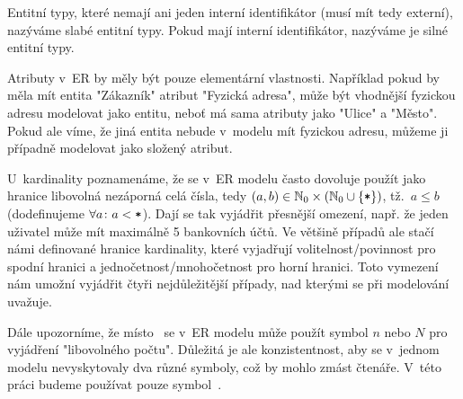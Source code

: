 Entitní typy, které nemají ani jeden interní identifikátor (musí mít tedy externí), nazýváme slabé entitní typy.
Pokud mají interní identifikátor, nazýváme je silné entitní typy.

Atributy v~ER by měly být pouze elementární vlastnosti.
Například pokud by měla mít entita "Zákazník" atribut "Fyzická adresa", může být vhodnější fyzickou adresu modelovat jako entitu, neboť má sama atributy jako "Ulice" a "Město".
Pokud ale víme, že jiná entita nebude v~modelu mít fyzickou adresu, můžeme ji případně modelovat jako složený atribut.

U~kardinality poznamenáme, že se v~ER modelu často dovoluje použít jako hranice libovolná nezáporná celá čísla, tedy $(a, b)\in \mathbb N_0\times \left(\mathbb N_0 \cup \left\{\texttt{*}\right\}\right)$, tž.~$a\leq b$ (dodefinujeme $\forall a\colon a < \texttt{*}$).
Dají se tak vyjádřit přesnější omezení, např. že jeden uživatel může mít maximálně 5 bankovních účtů.
Ve většině případů ale stačí námi definované hranice kardinality, které vyjadřují volitelnost/povinnost pro spodní hranici a jednočetnost/mnohočetnost pro horní hranici.
Toto vymezení nám umožní vyjádřit čtyři nejdůležitější případy, nad kterými se při modelování uvažuje.

Dále upozorníme, že místo~\many{} se v~ER modelu může použít symbol $n$ nebo $N$ pro vyjádření "libovolného počtu".
Důležitá je ale konzistentnost, aby se v~jednom modelu nevyskytovaly dva různé symboly, což by mohlo zmást čtenáře.
V~této práci budeme používat pouze symbol~\many{}.

